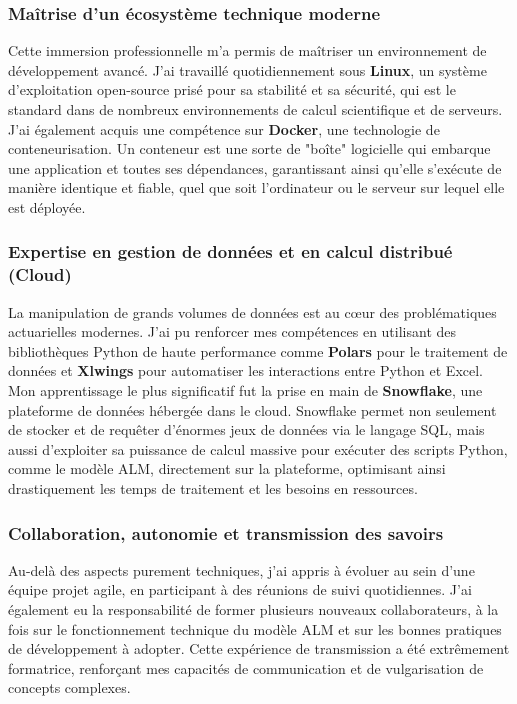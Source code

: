 \subsubsection{Maîtrise d'un écosystème technique moderne}

Cette immersion professionnelle m'a permis de maîtriser un environnement de développement avancé. J'ai travaillé quotidiennement sous \textbf{Linux}, un système d'exploitation open-source prisé pour sa stabilité et sa sécurité, qui est le standard dans de nombreux environnements de calcul scientifique et de serveurs. J'ai également acquis une compétence sur \textbf{Docker}, une technologie de conteneurisation. Un conteneur est une sorte de "boîte" logicielle qui embarque une application et toutes ses dépendances, garantissant ainsi qu'elle s'exécute de manière identique et fiable, quel que soit l'ordinateur ou le serveur sur lequel elle est déployée.



\subsubsection{Expertise en gestion de données et en calcul distribué (Cloud)}

La manipulation de grands volumes de données est au cœur des problématiques actuarielles modernes. J'ai pu renforcer mes compétences en utilisant des bibliothèques Python de haute performance comme \textbf{Polars} pour le traitement de données et \textbf{Xlwings} pour automatiser les interactions entre Python et Excel. Mon apprentissage le plus significatif fut la prise en main de \textbf{Snowflake}, une plateforme de données hébergée dans le cloud. Snowflake permet non seulement de stocker et de requêter d'énormes jeux de données via le langage SQL, mais aussi d'exploiter sa puissance de calcul massive pour exécuter des scripts Python, comme le modèle ALM, directement sur la plateforme, optimisant ainsi drastiquement les temps de traitement et les besoins en ressources.



\subsubsection{Collaboration, autonomie et transmission des savoirs}

Au-delà des aspects purement techniques, j'ai appris à évoluer au sein d'une équipe projet agile, en participant à des réunions de suivi quotidiennes. J'ai également eu la responsabilité de former plusieurs nouveaux collaborateurs, à la fois sur le fonctionnement technique du modèle ALM et sur les bonnes pratiques de développement à adopter. Cette expérience de transmission a été extrêmement formatrice, renforçant mes capacités de communication et de vulgarisation de concepts complexes.